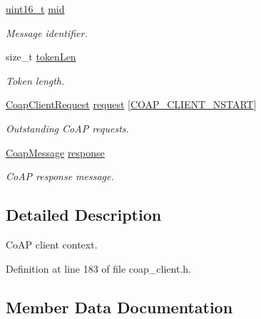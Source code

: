 \begin{DoxyCompactItemize}
\hyperlink{stdint_8h_a273cf69d639a59973b6019625df33e30}{uint16\+\_\+t} \hyperlink{struct__CoapClientContext_a53902f5a9b21d87bf6cc89c07bb88e3a}{mid}
\begin{DoxyCompactList}\small\item\em Message identifier. \end{DoxyCompactList}\item 
size\+\_\+t \hyperlink{struct__CoapClientContext_a9ef148277ce56ba767fad56feb3ca778}{token\+Len}
\begin{DoxyCompactList}\small\item\em Token length. \end{DoxyCompactList}\item 
\hyperlink{coap__client_8h_a3dac6728ded461f458ffd870eca7afe7}{Coap\+Client\+Request} \hyperlink{struct__CoapClientContext_afb7087744490cb68a6d77ec4f9effde3}{request} \mbox{[}\hyperlink{coap__client_8h_a1d9b5c1d8e03256e7164e0e26995654d}{C\+O\+A\+P\+\_\+\+C\+L\+I\+E\+N\+T\+\_\+\+N\+S\+T\+A\+RT}\mbox{]}
\begin{DoxyCompactList}\small\item\em Outstanding Co\+AP requests. \end{DoxyCompactList}\item 
\hyperlink{structCoapMessage}{Coap\+Message} \hyperlink{struct__CoapClientContext_a2cc779e38e244724dc96c6fff066217f}{response}
\begin{DoxyCompactList}\small\item\em Co\+AP response message. \end{DoxyCompactList}\end{DoxyCompactItemize}


\subsection{Detailed Description}
Co\+AP client context. 

Definition at line 183 of file coap\+\_\+client.\+h.



\subsection{Member Data Documentation}
\mbox{\label{struct__CoapClientContext_a338650e4c136cc6e9f98766df8ee0ffa}} 
